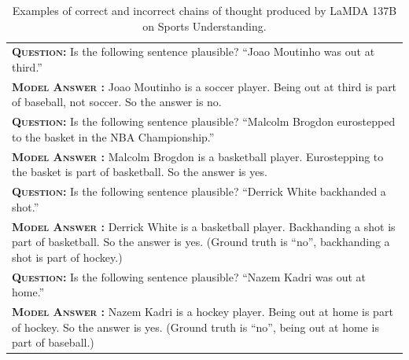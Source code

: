 \documentclass[]{article}
\newcommand{\xmark}{\ding{55}}%
\theoremstyle{plain}
\theoremstyle{definition}
\theoremstyle{remark}
\newcommand{\lamda}[0]{LaMDA}
\begin{document}
\endgroup
{}
\begingroup
\begin{table}[h]
    \centering
    \small
    \caption{
    Examples of correct and incorrect chains of thought produced by \lamda{} 137B on Sports Understanding.
    }
    \begin{tabular}{p{\linewidth}}
        \toprule
        \vspace{-2mm}
        \textbf{\textsc{Question:}}  Is the following sentence plausible? ``Joao Moutinho was out at third.'' \\
        \vspace{-1mm}
        \textbf{\textsc{Model Answer \color{darkGreen}{(CORRECT)}:}} Joao Moutinho is a soccer player. Being out at third is part of baseball, not soccer. So the answer is no. \color{darkGreen}{\checkmark} \\
        \midrule
        \vspace{-2mm}
        \textbf{\textsc{Question:}} Is the following sentence plausible? ``Malcolm Brogdon eurostepped to the basket in the NBA Championship.'' \\
        \vspace{-1mm}
        \textbf{\textsc{Model Answer \color{darkGreen}{(CORRECT)}:}} Malcolm Brogdon is a basketball player. Eurostepping to the basket is part of basketball. So the answer is yes. \color{darkGreen}{\checkmark} \\
        \midrule
        \vspace{-2mm}
        \textbf{\textsc{Question:}} Is the following sentence plausible? ``Derrick White backhanded a shot.'' \\
        \vspace{-1mm}
        \textbf{\textsc{Model Answer \color{blue}{(INCORRECT)}:}} Derrick White is a basketball player. {\color{blue} Backhanding a shot is part of basketball.} So the answer is yes. {\color{blue} \xmark{} (Ground truth is ``no'', backhanding a shot is part of hockey.)} \\
        \midrule
        \vspace{-2mm}
        \textbf{\textsc{Question:}} Is the following sentence plausible? ``Nazem Kadri was out at home.'' \\
        \vspace{-1mm}
        \textbf{\textsc{Model Answer \color{blue}{(INCORRECT)}:}} Nazem Kadri is a hockey player. {\color{blue}Being out at home is part of hockey.} So the answer is yes. {\color{blue} \xmark{} (Ground truth is ``no'', being out at home is part of baseball.)} \\
        \bottomrule
    \end{tabular}
    \label{tab:appendix-sports-understanding-examples}
\end{table}
\end{document}
